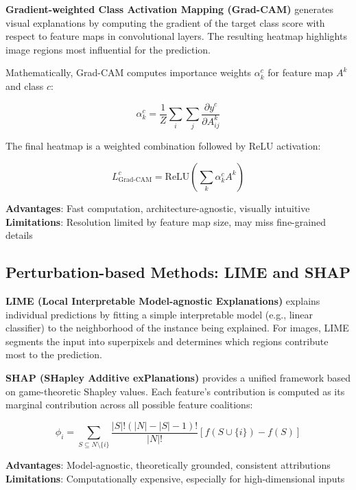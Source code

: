 \documentclass[12pt,a4paper]{report}
\begin{document}
\textbf{Gradient-weighted Class Activation Mapping (Grad-CAM)} generates visual explanations by computing the gradient of the target class score with respect to feature maps in convolutional layers. The resulting heatmap highlights image regions most influential for the prediction.

Mathematically, Grad-CAM computes importance weights $\alpha_k^c$ for feature map $A^k$ and class $c$:

\begin{equation}
\alpha_k^c = \frac{1}{Z} \sum_i \sum_j \frac{\partial y^c}{\partial A_{ij}^k}
\end{equation}

The final heatmap is a weighted combination followed by ReLU activation:

\begin{equation}
L^c_{\text{Grad-CAM}} = \text{ReLU}\left(\sum_k \alpha_k^c A^k\right)
\end{equation}

\textbf{Advantages}: Fast computation, architecture-agnostic, visually intuitive\\
\textbf{Limitations}: Resolution limited by feature map size, may miss fine-grained details

\subsection{Perturbation-based Methods: LIME and SHAP}

\textbf{LIME (Local Interpretable Model-agnostic Explanations)} explains individual predictions by fitting a simple interpretable model (e.g., linear classifier) to the neighborhood of the instance being explained. For images, LIME segments the input into superpixels and determines which regions contribute most to the prediction.

\textbf{SHAP (SHapley Additive exPlanations)} provides a unified framework based on game-theoretic Shapley values. Each feature's contribution is computed as its marginal contribution across all possible feature coalitions:

\begin{equation}
\phi_i = \sum_{S \subseteq N \setminus \{i\}} \frac{|S|!(|N|-|S|-1)!}{|N|!} [f(S \cup \{i\}) - f(S)]
\end{equation}

\textbf{Advantages}: Model-agnostic, theoretically grounded, consistent attributions\\
\textbf{Limitations}: Computationally expensive, especially for high-dimensional inputs
\end{document}

